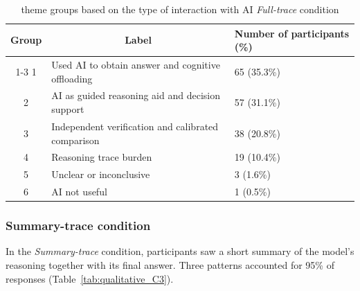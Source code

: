 \documentclass[acmlarge,review=true, anonymous=true]{acmart}
\begin{document}



\begin{table}[!htp]
\centering
\label{tab:qualitative_C2}
\begin{tabular}{cll}
\hline
Group & \multicolumn{1}{c}{Label}                                            & Number of participants (\%)        \\ \cline{1-3}
1     & Used AI to obtain answer and cognitive offloading  & 65 (35.3\%)     \\
2     & AI as guided reasoning aid and decision support    & 57 (31.1\%)   \\
3     & Independent verification and calibrated comparison & 38 (20.8\%)   \\
4     & Reasoning trace burden                           & 19 (10.4\%)     \\
5     & Unclear or inconclusive                           & 3 (1.6\%)     \\
6     & AI not useful                                    & 1 (0.5\%)    \\
\hline
\end{tabular}
\caption{theme groups based on the type of interaction with AI \textit{Full-trace} condition}
\label{tab:qualitative_C2}
\end{table}



\subsubsection{Summary-trace condition} 

In the \textit{Summary-trace} condition, participants saw a short summary of the model's reasoning together with its final answer. Three patterns accounted for 95\% of responses (Table~\ref{tab:qualitative_C3}).
\end{document}
